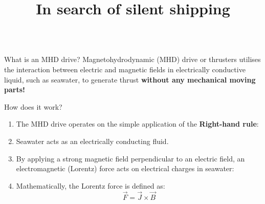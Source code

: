 \documentclass[mathserif]{beamer}
\title{ In search of silent shipping}
\institute{\centering Centre for Fluids and Complex Systems, Coventry University}
\begin{document}
\begin{frame}[t]{}
	\begin{columns}[T]
		\begin{column}{0.35\textwidth}
			\begin{block}{What is an MHD drive?}
				Magnetohydrodynamic (MHD) drive or thrusters utilises the interaction between electric and magnetic fields in electrically conductive liquid, such as seawater, to generate thrust \textbf{without any mechanical moving parts!}
			\end{block}
			\begin{block}{How does it work?}
				\begin{enumerate}
					\item The MHD drive operates on the simple application of the \textbf{Right-hand rule}:
					\begin{center}
					\end{center}
					\item Seawater acts as an electrically conducting fluid. 
					\item By applying a strong magnetic field perpendicular to an electric field, an electromagnetic (Lorentz) force acts on electrical charges in seawater:
					\begin{center}
					\end{center}					
					\item Mathematically, the Lorentz force is defined as:
						$$\overrightarrow {F} = \overrightarrow{J} \times \overrightarrow{B}$$
						

\end{enumerate}
\end{block}
\end{column}
\end{columns}
\end{frame}
\end{document}

